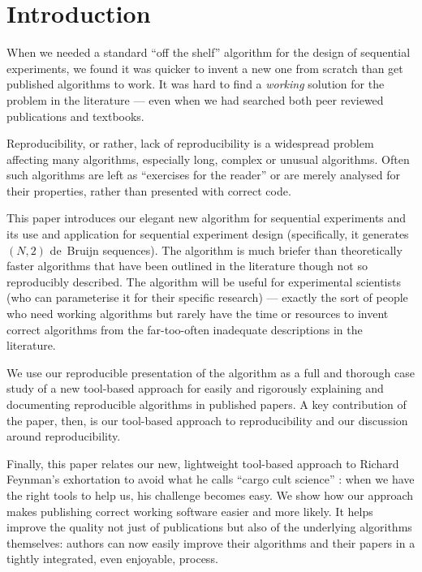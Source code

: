 \documentclass[preprint,times]{elsarticle}
\begin{document}
\maketitle

\section{Introduction}
When we needed a standard ``off the shelf'' algorithm for the design of sequential experiments, we found it was quicker to invent a new one from scratch than get published algorithms to work. It was hard to find a \emph{working\/} solution for the problem in the literature --- even when we had searched both peer reviewed publications and textbooks. 

Reproducibility, or rather, lack of reproducibility is a widespread problem affecting many algorithms, especially long, complex or unusual algorithms. Often such algorithms are left as ``exercises for the reader'' or are merely analysed for their properties, rather than presented with correct code.

This paper introduces our elegant new algorithm for sequential experiments and its use and application for sequential experiment design (specifically, it generates $(N,2)$ de~Bruijn sequences). The algorithm is much briefer than theoretically faster algorithms that have been outlined in the literature though not so reproducibly described. The algorithm will be useful for experimental scientists (who can parameterise it for their specific research) --- exactly the sort of people who need working algorithms but rarely have the time or resources to invent correct algorithms from the far-too-often inadequate descriptions in the literature.

We use our reproducible presentation of the algorithm as a full and thorough case study of a new tool-based approach for easily and rigorously explaining and documenting reproducible algorithms in published papers. A key contribution of the paper, then, is our tool-based approach to reproducibility and our discussion around reproducibility.

Finally, this paper relates our new, lightweight tool-based approach to Richard Feynman's exhortation to avoid what he calls ``cargo cult science'' \cite{feynman}: when we have the right tools to help us, his challenge becomes easy. We show how our approach makes publishing correct working software easier and more likely. It helps improve the quality not just of publications but also of the underlying algorithms themselves: authors can now easily improve their algorithms and their papers in a tightly integrated, even enjoyable, process.
 
\end{document}
